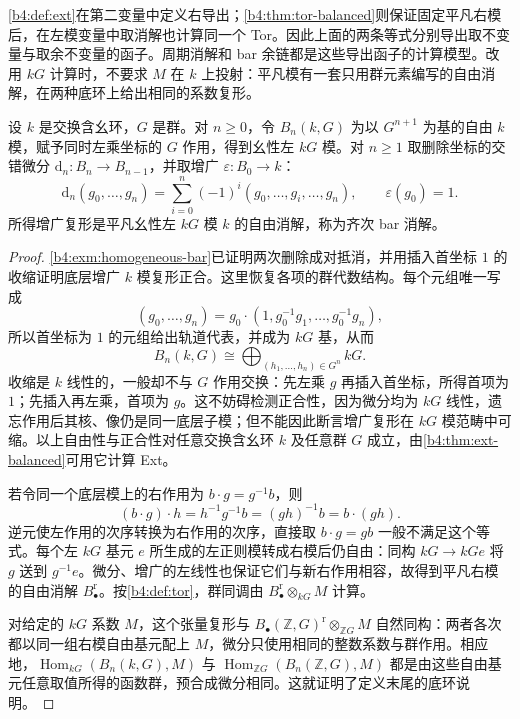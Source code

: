 \cref{b4:def:ext}在第二变量中定义右导出；\cref{b4:thm:tor-balanced}则保证固定平凡右模后，在左模变量中取消解也计算同一个 Tor。因此上面的两条等式分别导出取不变量与取余不变量的函子。周期消解和 bar 余链都是这些导出函子的计算模型。改用 \(kG\) 计算时，不要求 \(M\) 在 \(k\) 上投射：平凡模有一套只用群元素编写的自由消解，在两种底环上给出相同的系数复形。

\begin{proposition}\label{b4:prop:group-bar-resolution}
	设 \(k\) 是交换含幺环，\(G\) 是群。对 \(n\ge0\)，令 \(B_n(k,G)\) 为以 \(G^{n+1}\) 为基的自由 \(k\) 模，赋予同时左乘坐标的 \(G\) 作用，得到幺性左 \(kG\) 模。对 \(n\ge1\) 取删除坐标的交错微分 \(\mathrm{d}_n:B_n\to B_{n-1}\)，并取增广 \(\varepsilon:B_0\to k\)：
	\[
		\mathrm{d}_n(g_0,\ldots,g_n)=\sum_{i=0}^n(-1)^i(g_0,\ldots,\widehat{g_i},\ldots,g_n), \qquad \varepsilon(g_0)=1.
	\]
	所得增广复形是平凡幺性左 \(kG\) 模 \(k\) 的自由消解，称为齐次 bar 消解。
\end{proposition}
\begin{proof}
	\cref{b4:exm:homogeneous-bar}已证明两次删除成对抵消，并用插入首坐标 \(1\) 的收缩证明底层增广 \(k\) 模复形正合。这里恢复各项的群代数结构。每个元组唯一写成
	\[
		(g_0,\ldots,g_n)=g_0\cdot(1,g_0^{-1}g_1,\ldots,g_0^{-1}g_n),
	\]
	所以首坐标为 \(1\) 的元组给出轨道代表，并成为 \(kG\) 基，从而
	\[
		B_n(k,G)\cong\bigoplus_{(h_1,\ldots,h_n)\in G^n}kG.
	\]
	收缩是 \(k\) 线性的，一般却不与 \(G\) 作用交换：先左乘 \(g\) 再插入首坐标，所得首项为 \(1\)；先插入再左乘，首项为 \(g\)。这不妨碍检测正合性，因为微分均为 \(kG\) 线性，遗忘作用后其核、像仍是同一底层子模；但不能因此断言增广复形在 \(kG\) 模范畴中可缩。以上自由性与正合性对任意交换含幺环 \(k\) 及任意群 \(G\) 成立，由\cref{b4:thm:ext-balanced}可用它计算 Ext。

	若令同一个底层模上的右作用为 \(b\cdot g=g^{-1}b\)，则
	\[
		(b\cdot g)\cdot h=h^{-1}g^{-1}b=(gh)^{-1}b=b\cdot(gh).
	\]
	逆元使左作用的次序转换为右作用的次序，直接取 \(b\cdot g=gb\) 一般不满足这个等式。每个左 \(kG\) 基元 \(e\) 所生成的左正则模转成右模后仍自由：同构 \(kG\to kGe\) 将 \(g\) 送到 \(g^{-1}e\)。微分、增广的左线性也保证它们与新右作用相容，故得到平凡右模的自由消解 \(B_\bullet^{\mathrm r}\)。按\cref{b4:def:tor}，群同调由 \(B_\bullet^{\mathrm r}\otimes_{kG}M\) 计算。

	对给定的 \(kG\) 系数 \(M\)，这个张量复形与 \(B_\bullet(\mathbb Z,G)^{\mathrm r}\otimes_{\mathbb ZG}M\) 自然同构：两者各次都以同一组右模自由基元配上 \(M\)，微分只使用相同的整数系数与群作用。相应地，\(\operatorname{Hom}_{kG}(B_n(k,G),M)\) 与 \(\operatorname{Hom}_{\mathbb ZG}(B_n(\mathbb Z,G),M)\) 都是由这些自由基元任意取值所得的函数群，预合成微分相同。这就证明了定义末尾的底环说明。
\end{proof}

